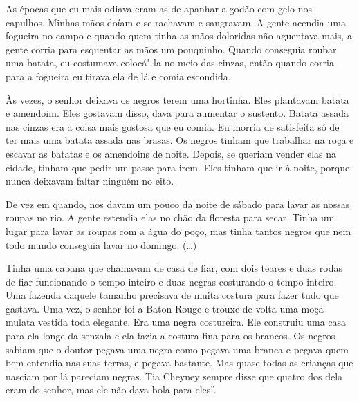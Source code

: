 As épocas que eu mais odiava eram as de apanhar algodão com gelo nos
capulhos. Minhas mãos doíam e se rachavam e sangravam. A gente acendia
uma fogueira no campo e quando quem tinha as mãos doloridas não
aguentava mais, a gente corria para esquentar as mãos um pouquinho.
Quando conseguia roubar uma batata, eu costumava colocá"-la no meio das
cinzas, então quando corria para a fogueira eu tirava ela de lá e comia
escondida.

Às vezes, o senhor deixava os negros terem uma hortinha. Eles
plantavam batata e amendoim. Eles gostavam disso, dava para aumentar o
sustento. Batata assada nas cinzas era a coisa mais gostosa que eu
comia. Eu morria de satisfeita só de ter mais uma batata assada nas
brasas. Os negros tinham que trabalhar na roça e escavar as batatas e os
amendoins de noite. Depois, se queriam vender elas na cidade, tinham que
pedir um passe para irem. Eles tinham que ir à noite, porque nunca
deixavam faltar ninguém no eito.

De vez em quando, nos davam um pouco da noite de sábado para lavar as
nossas roupas no rio. A gente estendia elas no chão da floresta para
secar. Tinha um lugar para lavar as roupas com a água do poço, mas tinha
tantos negros que nem todo mundo conseguia lavar no domingo. (\ldots{})


Tinha uma cabana que chamavam de casa de fiar, com dois teares e duas
rodas de fiar funcionando o tempo inteiro e duas negras costurando o
tempo inteiro. Uma fazenda daquele tamanho precisava de muita costura
para fazer tudo que gastava. Uma vez, o senhor foi a Baton Rouge e
trouxe de volta uma moça mulata vestida toda elegante. Era uma negra
costureira. Ele construiu uma casa para ela longe da senzala e ela fazia
a costura fina para os brancos. Os negros sabiam que o doutor pegava uma
negra como pegava uma branca e pegava quem bem entendia nas suas terras,
e pegava bastante. Mas quase todas as crianças que nasciam por lá
pareciam negras. Tia Cheyney sempre disse que quatro dos dela eram do
senhor, mas ele não dava bola para eles''.

